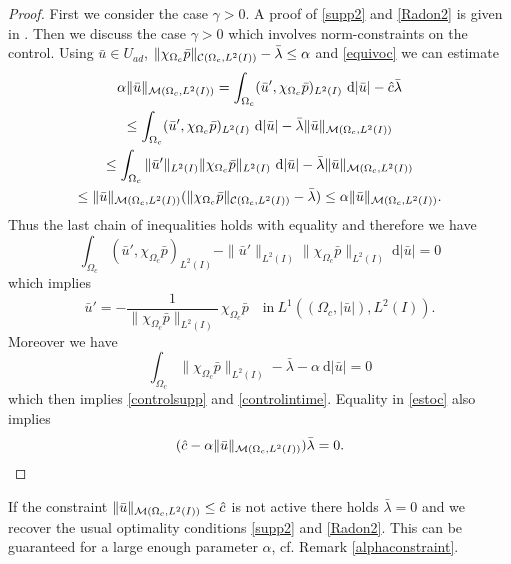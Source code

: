 \begin{proof}
{\color{red}First we consider the case $\gamma>0$. A proof of \eqref{supp2} and \eqref{Radon2} is given in \cite{pieper2014}.} Then we discuss the case $\gamma>0$ which involves norm-constraints on the control.
Using $\bar u\in U_{ad}$, $\|\chi_{\Omega_c}\bar p\|_{\mathcal{C}(\Omega_c, L^{2}(I))}-\bar\lambda\leq\alpha$ and \eqref{equivoc} we can estimate
\begin{multline}\label{estoc}
\alpha\|\bar u\|_{\M}=\int_{\Omega_c}(\bar u',\chi_{\Omega_c}\bar p)_{L^2(I)}~\mathrm d|\bar u|-\hat c\bar\lambda\\
\leq \int_{\Omega_c}(\bar u',\chi_{\Omega_c}\bar p)_{L^2(I)}~\mathrm d|\bar u|-\bar\lambda\|\bar u\|_{\M}\\
\leq \int_{\Omega_c}\|\bar u'\|_{L^2(I)}\|\chi_{\Omega_c}\bar p\|_{L^2(I)}~\mathrm d|\bar u|-\bar\lambda\|\bar u\|_{\M}\\
\leq\|\bar u\|_{\M}(\|\chi_{\Omega_c}\bar p\|_{\C}-\bar\lambda)\leq \alpha\|\bar u\|_{\M}.
\end{multline}
Thus the last chain of inequalities holds with equality and therefore we have
\[
\int_{\Omega_c}(\bar u',\chi_{\Omega_c}\bar p)_{L^2(I)}-\|\bar u'\|_{L^2(I)}\|\chi_{\Omega_c}\bar p\|_{L^2(I)}~\mathrm d|\bar u|=0
\]
which implies \[\bar u'=-\frac 1{\|\chi_{\Omega_c}\bar p\|_{L^2(I)}}\,\chi_{\Omega_c}\bar p\quad\text{in}~ L^1((\Omega_c,|\bar u|),L^2(I)).\]
Moreover we have
\[
\int_{\Omega_c}\|\chi_{\Omega_c}\bar p\|_{L^2(I)}-\bar\lambda-\alpha~\mathrm d|\bar u|=0
\]
which then implies \eqref{controlsupp} and \eqref{controlintime}. Equality in \eqref{estoc} also implies
\[
(\hat c-\alpha\|\bar u\|_{\mathcal{M}(\Omega_c, L^{2}(I))})\bar\lambda=0.
\]
\qquad\end{proof}

{\color{red}
\begin{remark}
If the constraint $\|\bar u\|_{\mathcal{M}(\Omega_c, L^{2}(I))}\leq \hat c$ is not active there holds $\bar \lambda=0$ and we recover the usual optimality conditions \eqref{supp2} and \eqref{Radon2}. This can be guaranteed for a large enough parameter $\alpha$, cf. Remark \ref{alphaconstraint}.
\end{remark}}



